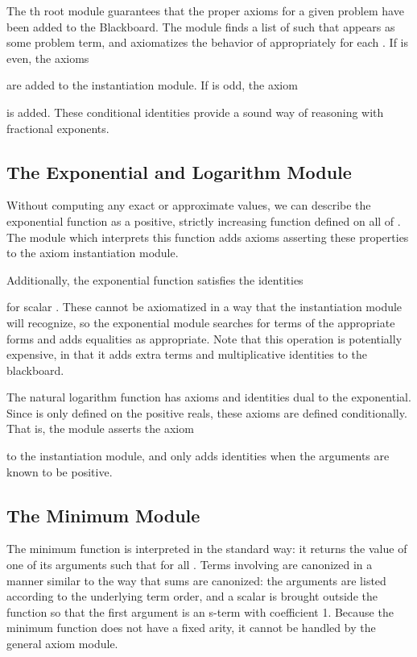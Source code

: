 \documentclass[runningheds]{llncs}
\begin{document}
The th root module guarantees that the proper axioms for a given problem have been added to the Blackboard. The module finds a list of  such that  appears as some problem term, and axiomatizes the behavior of  appropriately for each . If  is even, the axioms

are added to the instantiation module. If  is odd, the axiom

is added. These conditional identities provide a sound way of reasoning with fractional exponents.

\subsection{The Exponential and Logarithm Module}
\label{subsection:exponential}
Without computing any exact or approximate values, we can describe the exponential function  as a positive, strictly increasing function defined on all of . The module which interprets this function adds axioms asserting these properties to the axiom instantiation module.

Additionally, the exponential function satisfies the identities 

for scalar . These cannot be axiomatized in a way that the instantiation module will recognize, so the exponential module searches for terms of the appropriate forms and adds equalities as appropriate. Note that this operation is potentially expensive, in that it adds extra terms and multiplicative identities to the blackboard.

The natural logarithm function  has axioms and identities dual to the exponential. Since  is only defined on the positive reals, these axioms are defined conditionally. That is, the module asserts the axiom

to the instantiation module, and only adds identities when the arguments are known to be positive.

\subsection{The Minimum Module}
\label{subsection:minimum}

The minimum function  is interpreted in the standard way: it returns the value of one of its arguments  such that  for all . Terms involving  are canonized in a manner similar to the way that sums are canonized: the arguments are listed according to the underlying term order, and a scalar is brought outside the function so that the first argument is an s-term with coefficient 1. Because the minimum function does not have a fixed arity, it cannot be handled by the general axiom module.
\end{document}
